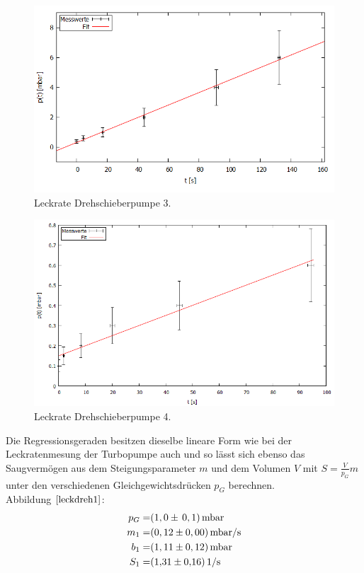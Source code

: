 \begin{figure}[H]
  \centering
  \includegraphics[width=14cm]{bilder/leckdrehfit3.png}
  \caption{Leckrate Drehschieberpumpe 3.}
  \label{leckdreh3}
\end{figure}
\begin{figure}[H]
  \centering
  \includegraphics[width=14cm]{bilder/leckdrehfit4.png}
  \caption{Leckrate Drehschieberpumpe 4.}
  \label{leckdreh4}
\end{figure}
Die Regressionsgeraden besitzen dieselbe lineare Form wie bei der Leckratenmesung der Turbopumpe auch und so lässt sich ebenso das Saugvermögen
aus dem Steigungsparameter $m$ und dem Volumen $V$ mit $S=\frac{V}{p_G}m$ unter den verschiedenen Gleichgewichtsdrücken $p_G$ berechnen.\\
Abbildung $\ref{leckdreh1}$:
	\begin{align*}
		p_G=& (1,0 \pm \, 0,1)  \, \si{mbar}\\
		m_1=& (0,12 \pm 0,00) \, \si{mbar/s}\\
		b_1=& (1,11 \pm 0,12) \, \si{mbar}\\
		S_1=& \SI{1,31 \pm 0,16}{1/s}
	\end{align*}
